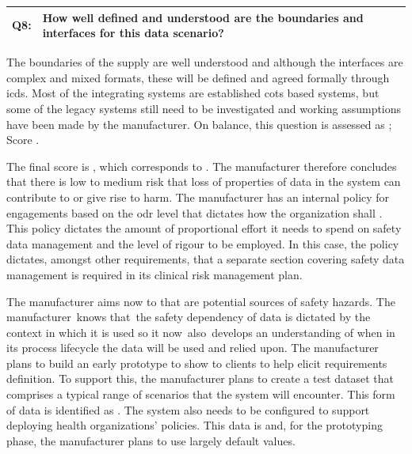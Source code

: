 \begin{longtable*}[H]
  {|L{}|L{}|}
  \hline
  Q8: & How well defined and understood are the boundaries and interfaces for this data scenario?\\
  \hline
\end{longtable*}

The boundaries of the supply are well understood and although the interfaces are complex and mixed formats, these will be defined and agreed formally through \glspl{icd}. Most of the integrating systems are established \gls{cots} based systems, but some of the legacy systems still need to be investigated and working assumptions have been
made by the manufacturer. On balance, this question is assessed as ; Score .

The final score is , which corresponds to . The manufacturer therefore concludes that there is low to medium risk that loss of properties of data in the system can contribute to or give rise to harm. The manufacturer has an internal policy for engagements based on the \gls{odr} level that dictates how the organization shall . This policy dictates the amount of proportional effort it needs to spend on safety data management and the level of rigour to be employed. In this case, the policy dictates, amongst other requirements, that a separate section covering safety data management is required in its clinical risk management plan.

The manufacturer aims now to  that are potential sources of safety hazards. The manufacturer\cbstart\ knows that\cbend\ the safety dependency of data is dictated by the context in which it is used so it now\cbstart\ also\cbend\ develops an understanding of when in its process lifecycle the data will be used and relied upon. The manufacturer plans to build an early prototype to show to clients to help elicit requirements definition. To support this, the manufacturer plans to create a test \gls{dataset} that comprises a typical range of scenarios that the system will encounter. This form of data is identified as . The system also needs to be configured to support deploying health organizations' policies. This data is  and, for the prototyping phase, the manufacturer plans to use largely default values.

